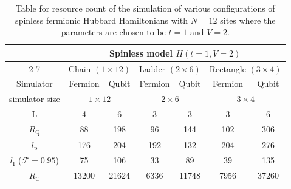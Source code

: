 \documentclass[aps, pra, reprint, superscriptaddress]{revtex4-1}
\begin{document}
\begin{table}[htbp]
\begin{tabular}{|c|cccccc|}
\hline
& \multicolumn{6}{c|}{ Spinless model $H(t{=}1,V{=}2)$}\\
\cline{2-7} 
\multirow{3}{*}{} & 
\multicolumn{2}{c|}{Chain $(1{\times} 12)$} & 
\multicolumn{2}{c|}{Ladder $(2{\times} 6)$} & 
\multicolumn{2}{c|}{Rectangle $(3{\times} 4)$} \\ 

\hline
Simulator & 
\multicolumn{1}{c|}{Fermion} & \multicolumn{1}{c|}{Qubit} & 
\multicolumn{1}{c|}{Fermion} & 
\multicolumn{1}{c|}{Qubit} & 
\multicolumn{1}{c|}{Fermion} & Qubit  \\ 

\hline
simulator size & 
\multicolumn{2}{c|}{$1{\times} 12$} & 
\multicolumn{2}{c|}{$2{\times} 6$} & 
\multicolumn{2}{c|}{$3{\times} 4$}\\ 
\hline
L & 
\multicolumn{1}{c|}{4} & 
\multicolumn{1}{c|}{6} & 
\multicolumn{1}{c|}{3} & 
\multicolumn{1}{c|}{3} & 
\multicolumn{1}{c|}{3} & 6      \\ 

\hline
$R_\text{Q}$ & 
\multicolumn{1}{c|}{88} & 
\multicolumn{1}{c|}{198} & 
\multicolumn{1}{c|}{96} & 
\multicolumn{1}{c|}{144} & 
\multicolumn{1}{c|}{102} & 306   \\ 
\hline

$l_\text{p}$          & 
\multicolumn{1}{c|}{176} & 
\multicolumn{1}{c|}{204} & 
\multicolumn{1}{c|}{192} & 
\multicolumn{1}{c|}{132} & 
\multicolumn{1}{c|}{204} & 276     \\ 

\hline
$l_\text{I}$ ($\mathcal{F}{=}0.95$) & 
\multicolumn{1}{c|}{75}      & 
\multicolumn{1}{c|}{106}   & 
\multicolumn{1}{c|}{33}      & 
\multicolumn{1}{c|}{89}    & 
\multicolumn{1}{c|}{39}      & 135    \\ 
\hline

$R_\text{C}$                     & 
\multicolumn{1}{c|}{13200}   & 
\multicolumn{1}{c|}{21624} & 
\multicolumn{1}{c|}{6336}    & 
\multicolumn{1}{c|}{11748} & 
\multicolumn{1}{c|}{7956}    & 37260 \\ 
\hline

\end{tabular}
\caption{Table for resource count of the simulation of various configurations of spinless fermionic Hubbard Hamiltonians with $N{=}12$ sites where the parameters are chosen to be $t{=}1$ and $V{=}2$.}
\label{table:spinless}
\end{table}
\end{document}
